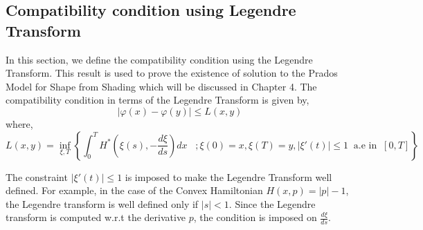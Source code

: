 \subsection{Compatibility condition using Legendre Transform}
In this section, we define the compatibility condition using the
Legendre Transform. This result is used to prove the existence of
solution to the Prados Model for Shape from Shading which will be
discussed in Chapter 4. The compatibility condition in terms of the
Legendre Transform is given by,
\begin{equation}
  \lvert \varphi(x) -\varphi(y) \rvert \le L(x,y)\label{eq:15}
\end{equation}
where,
\begin{equation}
  L(x,y) = \inf_{\xi,T}\left\{\int_{0}^{T} H^*\left(\xi(s),-\frac{d\xi}{ds}\right) dx \;\;\; ; \xi(0) =
  x, \xi(T) = y, \lvert \xi'(t) \rvert \le 1 \;\;\text{a.e in}\;\; [0,T]\right\}\label{eq:16
}
\end{equation}

\noindent
The constraint $\lvert \xi'(t) \rvert \le 1$ is imposed to make the
Legendre Transform well defined. For example, in the case of the
Convex Hamiltonian $H(x,p) = \lvert p \rvert - 1$, the Legendre
transform is well defined only if $\lvert s \rvert < 1$. Since the
Legendre transform is computed w.r.t the derivative $p$, the condition
is imposed on $\frac{d\xi}{ds}$.\\

